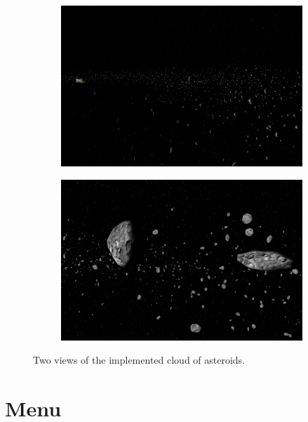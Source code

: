 \documentclass[paper=a4, fontsize=11pt]{scrartcl} %
\numberwithin{equation}{section} %
\numberwithin{figure}{section} %
\numberwithin{table}{section} %
\theoremstyle{definition}
\begin{document}
\begin{figure}
	\centering
	\begin{subfigure}{.48\textwidth}
		\centering
		\includegraphics[width=1.0\linewidth]{images/asteroids1.png}
	\end{subfigure}
	\begin{subfigure}{.48\textwidth}
		\centering
		\includegraphics[width=1.0\linewidth]{images/asteroids2.png}
	\end{subfigure}
	\caption{Two views of the implemented cloud of asteroids.}
	\label{fig:meteorites}
\end{figure}

\section{Menu}
\end{document}
